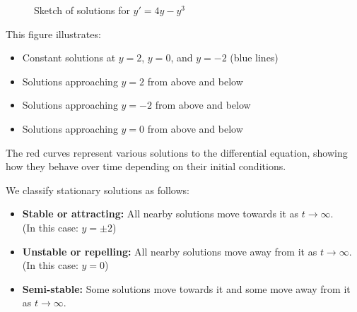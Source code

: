 \documentclass{article}
\begin{document}
\begin{figure}[h]
    \centering
    \caption{Sketch of solutions for $y' = 4y - y^3$}
    \label{fig:solutions_4y_minus_y3}
\end{figure}

This figure illustrates:
\begin{itemize}
    \item Constant solutions at $y=2$, $y=0$, and $y=-2$ (blue lines)
    \item Solutions approaching $y=2$ from above and below
    \item Solutions approaching $y=-2$ from above and below
    \item Solutions approaching $y=0$ from above and below
\end{itemize}

The red curves represent various solutions to the differential equation, showing how they behave over time depending on their initial conditions.

We classify stationary solutions as follows:

\begin{itemize}
    \item \textbf{Stable or attracting:} All nearby solutions move towards it as $t \rightarrow \infty$. 
          \\ (In this case: $y = \pm 2$)
    
    \item \textbf{Unstable or repelling:} All nearby solutions move away from it as $t \rightarrow \infty$. 
          \\ (In this case: $y = 0$)
    
    \item \textbf{Semi-stable:} Some solutions move towards it and some move away from it as $t \rightarrow \infty$.
\end{itemize}
\end{document}
